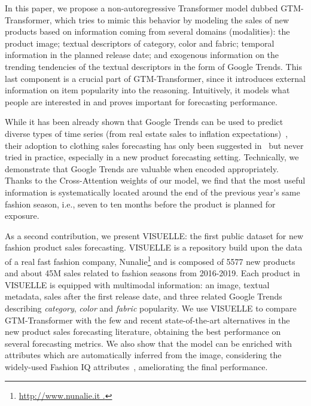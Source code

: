 \documentclass{article}
\newcommand{\datasetname}[0] {VISUELLE}
\newcommand{\approachname}[0] {GTM-Transformer\xspace}
\begin{document}
In this paper, we propose a non-autoregressive Transformer \cite{vaswani2017attention} model dubbed \approachname{}, which tries to mimic this behavior by modeling the sales of new products based on information coming from several domains (modalities): the product image; textual descriptors of category, color and fabric; temporal information in the planned release date; and exogenous information on the trending tendencies of the textual descriptors in the form of Google Trends. This last component is a crucial part of \approachname{}, since it introduces external information on item popularity into the reasoning. Intuitively, it models what people are interested in and proves important for forecasting performance.

While it has been already shown that Google Trends can be used to predict diverse types of time series (from real estate sales to inflation expectations)~\cite{wu20153,bulut2018google,hand2012searching,hamid2015forecasting,guzman2011internet,bangwayo2015can}, their adoption to clothing sales forecasting has only been suggested in~\cite{silva2019googling} but never tried in practice, especially in a new product forecasting setting. Technically, we demonstrate that Google Trends are valuable when encoded appropriately. Thanks to the Cross-Attention weights of our model, we find that the most useful information is systematically located around the end of the previous year's same fashion season, i.e., seven to ten months before the product is planned for exposure.

As a second contribution, we present \datasetname{}: the first public dataset for new fashion product sales forecasting. \datasetname{} is a repository build upon the data of a real fast fashion company, Nunalie\footnote{\url{http://www.nunalie.it .}} and is composed of 5577 new products and about 45M sales related to fashion seasons from 2016-2019. Each product in \datasetname{} is equipped with multimodal information: an image, textual metadata, sales after the first release date, and three related Google Trends describing \emph{category}, \emph{color} and \emph{fabric} popularity.  We use \datasetname{} to compare \approachname{} with the few and recent state-of-the-art alternatives in the new product sales forecasting literature, obtaining the best performance on several forecasting metrics. We also show that the model can be enriched with attributes which are automatically inferred from the image, considering the widely-used Fashion IQ attributes~\cite{wu2020fashion}, ameliorating the final performance. 
\end{document}
